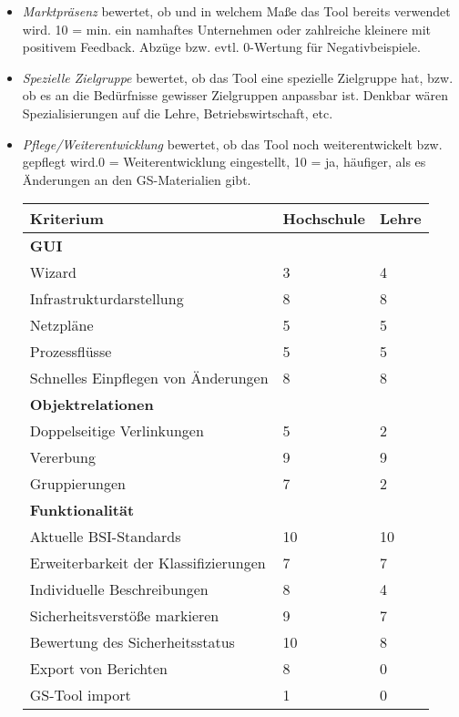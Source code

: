 \begin{itemize}
	\item \textit{Marktpräsenz} bewertet, ob und in welchem Maße das Tool bereits verwendet wird. 10 = min. ein namhaftes Unternehmen oder zahlreiche kleinere mit positivem Feedback. Abzüge bzw. evtl. 0-Wertung für Negativbeispiele.
	\item \textit{Spezielle Zielgruppe} bewertet, ob das Tool eine spezielle Zielgruppe hat, bzw. ob es an die Bedürfnisse gewisser Zielgruppen anpassbar ist. Denkbar wären Spezialisierungen auf die Lehre, Betriebswirtschaft, etc.
	\item \textit{Pflege/Weiterentwicklung} bewertet, ob das Tool noch weiterentwickelt bzw. gepflegt wird.0 = Weiterentwicklung eingestellt, 10 = ja, häufiger, als es Änderungen an den GS-Materialien gibt.

\begin{table}[h!tb]
	\begin{tabular}{|p{}|p{}|p{}|}
		\hline 
		Kriterium & Hochschule & Lehre\\ 
		\hline 
		\textbf{GUI}& &\\
		\hline
		Wizard & 3 & 4\\
		\hline 
		Infrastrukturdarstellung & 8 & 8 \\
		\hline 
		Netzpläne & 5 & 5 \\
		\hline 
		Prozessflüsse & 5 & 5 \\
		\hline 
		Schnelles Einpflegen von Änderungen & 8 & 8 \\
		\hline
		\textbf{Objektrelationen} & &\\
		\hline 
		Doppelseitige Verlinkungen & 5 & 2 \\
		\hline 
		Vererbung & 9 & 9 \\
		\hline 
		Gruppierungen & 7 & 2 \\
		\hline 
		\textbf{Funktionalität} & & \\
		\hline 
		Aktuelle BSI-Standards & 10 & 10\\
		\hline  
		Erweiterbarkeit der Klassifizierungen & 7 & 7 \\
		\hline 
		Individuelle Beschreibungen & 8 & 4 \\
		\hline 
		Sicherheitsverstöße markieren & 9 & 7 \\
		\hline
		Bewertung des Sicherheitsstatus & 10 & 8 \\
		\hline
		Export von Berichten & 8 & 0 \\
		\hline
		GS-Tool import & 1 & 0 \\

\end{tabular}
\end{table}
\end{itemize}
